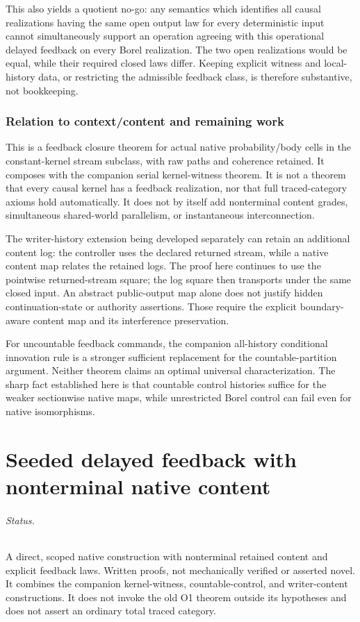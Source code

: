 \documentclass[11pt]{article}
\begin{document}
This also yields a quotient no-go: any semantics which identifies all causal realizations having the same open output law for every deterministic input cannot simultaneously support an operation agreeing with this operational delayed feedback on every Borel realization. The two open realizations would be equal, while their required closed laws differ. Keeping explicit witness and local-history data, or restricting the admissible feedback class, is therefore substantive, not bookkeeping.

\section{Relation to context/content and remaining work}
This is a feedback closure theorem for actual native probability/body cells in the constant-kernel stream subclass, with raw paths and coherence retained. It composes with the companion serial kernel-witness theorem. It is not a theorem that every causal kernel has a feedback realization, nor that full traced-category axioms hold automatically. It does not by itself add nonterminal content grades, simultaneous shared-world parallelism, or instantaneous interconnection.

The writer-history extension being developed separately can retain an additional content log: the controller uses the declared returned stream, while a native content map relates the retained logs. The proof here continues to use the pointwise returned-stream square; the log square then transports under the same closed input. An abstract public-output map alone does not justify hidden continuation-state or authority assertions. Those require the explicit boundary-aware content map and its interference preservation.

For uncountable feedback commands, the companion all-history conditional innovation rule is a stronger sufficient replacement for the countable-partition argument. Neither theorem claims an optimal universal characterization. The sharp fact established here is that countable control histories suffice for the weaker sectionwise native maps, while unrestricted Borel control can fail even for native isomorphisms.


\part{Seeded delayed feedback with nonterminal native content}

\paragraph{Status.} A direct, scoped native construction with nonterminal retained content and explicit feedback laws. Written proofs, not mechanically verified or asserted novel. It combines the companion kernel-witness, countable-control, and writer-content constructions. It does not invoke the old O1 theorem outside its hypotheses and does not assert an ordinary total traced category.
\end{document}
